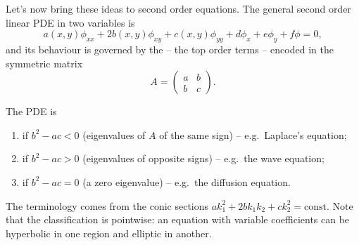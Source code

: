 Let's now bring these ideas to second order equations. The general second order linear PDE in two variables is
$$
a(x,y) \phi_{xx} + 2b(x, y) \phi_{xy} + c(x, y)\phi_{yy} + d \phi_x + e \phi_y + f \phi = 0,
$$
and its behaviour is governed by the  -- the top order terms -- encoded in the symmetric matrix
$$
A = \begin{pmatrix}
    a & b \\ b & c
\end{pmatrix}.
$$

\begin{definition}[Classification]
    The PDE is
    \begin{enumerate}[label=(\roman*)]
        \item {} if $b^2 - ac < 0$ (eigenvalues of $A$ of the same sign) -- e.g.\ Laplace's equation;
        \item {} if $b^2 - ac > 0$ (eigenvalues of opposite signs) -- e.g.\ the wave equation;
        \item {} if $b^2 - ac = 0$ (a zero eigenvalue) -- e.g.\ the diffusion equation.
    \end{enumerate}
\end{definition}

The terminology comes from the conic sections $a k_1^2 + 2b k_1 k_2 + c k_2^2 = \text{const}$. Note that the classification is pointwise: an equation with variable coefficients can be hyperbolic in one region and elliptic in another.

